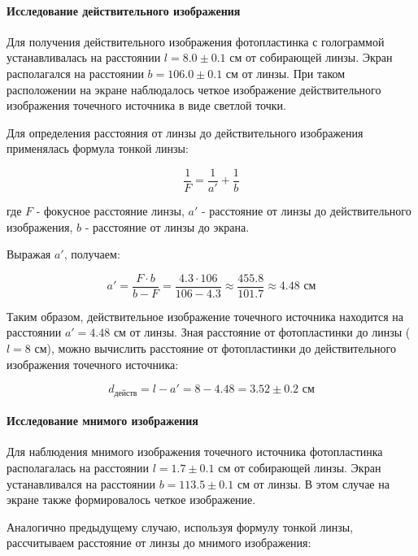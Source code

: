 \paragraph*{Исследование действительного изображения}

Для получения действительного изображения фотопластинка с голограммой устанавливалась на расстоянии $l = 8.0 \pm 0.1$ см от собирающей линзы. Экран располагался на расстоянии $b = 106.0 \pm 0.1$ см от линзы. При таком расположении на экране наблюдалось четкое изображение действительного изображения точечного источника в виде светлой точки.

Для определения расстояния от линзы до действительного изображения применялась формула тонкой линзы:

\begin{equation}
    \frac{1}{F} = \frac{1}{a'} + \frac{1}{b}
\end{equation}

где $F$ - фокусное расстояние линзы, $a'$ - расстояние от линзы до действительного изображения, $b$ - расстояние от линзы до экрана.

Выражая $a'$, получаем:

\begin{equation}
    a' = \frac{F \cdot b}{b - F} = \frac{4.3 \cdot 106}{106 - 4.3} \approx \frac{455.8}{101.7} \approx 4.48 \text{ см}
\end{equation}

Таким образом, действительное изображение точечного источника находится на расстоянии $a' = 4.48$ см от линзы. Зная расстояние от фотопластинки до линзы ($l = 8$ см), можно вычислить расстояние от фотопластинки до действительного изображения точечного источника:

\begin{equation}
    d_{\text{действ}} = l - a' = 8 - 4.48 = 3.52 \pm 0.2 \text{ см}
\end{equation}

\paragraph*{Исследование мнимого изображения}

Для наблюдения мнимого изображения точечного источника фотопластинка располагалась на расстоянии $l = 1.7 \pm 0.1$ см от собирающей линзы. Экран устанавливался на расстоянии $b = 113.5 \pm 0.1$ см от линзы. В этом случае на экране также формировалось четкое изображение.

Аналогично предыдущему случаю, используя формулу тонкой линзы, рассчитываем расстояние от линзы до мнимого изображения:

